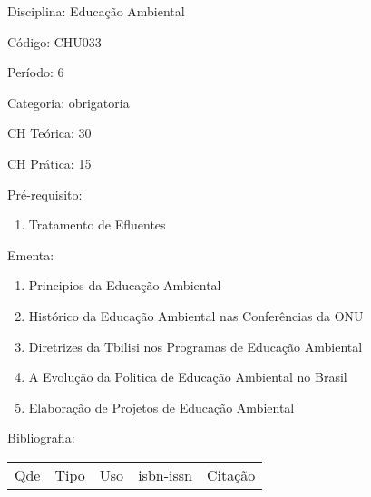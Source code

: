 \documentclass[12pt,a4paper,twoside]{report}
\begin{document}
Disciplina: Educação Ambiental

Código: CHU033

Período: 6

Categoria: obrigatoria

CH Teórica: 30

CH Prática: 15




Pré-requisito:
\begin{enumerate}
\item Tratamento de Efluentes
\end{enumerate}

Ementa:
\begin{enumerate}
\item Principios da Educação Ambiental
\item Histórico da Educação Ambiental nas Conferências da ONU
\item Diretrizes da Tbilisi nos Programas de Educação Ambiental
\item A Evolução da Politica de Educação Ambiental no Brasil
\item Elaboração de Projetos de Educação Ambiental
\end{enumerate}



Bibliografia:


\begin{tabular}{llllp{8cm}}
Qde & Tipo & Uso & isbn-issn & Citação \\
\end{tabular}
\end{document}
